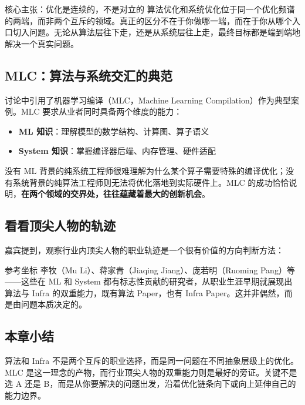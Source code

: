 \documentclass[a4paper]{article}
\begin{document}
\begin{importantbox}{核心主张：优化是连续的，不是对立的}
算法优化和系统优化位于同一个优化频谱的两端，而非两个互斥的领域。真正的区分不在于你做哪一端，而在于你从哪个入口切入问题。无论从算法层往下走，还是从系统层往上走，最终目标都是端到端地解决一个真实问题。
\end{importantbox}

\subsection{MLC：算法与系统交汇的典范}

讨论中引用了机器学习编译（MLC，Machine Learning Compilation）作为典型案例。MLC 要求从业者同时具备两个维度的能力：

\begin{itemize}
    \item \textbf{ML 知识}：理解模型的数学结构、计算图、算子语义
    \item \textbf{System 知识}：掌握编译器后端、内存管理、硬件适配
\end{itemize}

没有 ML 背景的纯系统工程师很难理解为什么某个算子需要特殊的编译优化；没有系统背景的纯算法工程师则无法将优化落地到实际硬件上。MLC 的成功恰恰说明，\textbf{在两个领域的交界处，往往蕴藏着最大的创新机会}。

\subsection{看看顶尖人物的轨迹}

嘉宾提到，观察行业内顶尖人物的职业轨迹是一个很有价值的方向判断方法：

\begin{knowledgebox}{参考坐标}
李牧（Mu Li）、蒋家青（Jiaqing Jiang）、庞若明（Ruoming Pang）等——这些在 ML 和 System 都有标志性贡献的研究者，从职业生涯早期就展现出算法与 Infra 的双重能力，既有算法 Paper，也有 Infra Paper。这并非偶然，而是由问题本质决定的。
\end{knowledgebox}

\subsection{本章小结}

算法和 Infra 不是两个互斥的职业选择，而是同一问题在不同抽象层级上的优化。MLC 是这一理念的产物，而行业顶尖人物的双重能力则是最好的旁证。关键不是选 A 还是 B，而是从你要解决的问题出发，沿着优化链条向下或向上延伸自己的能力边界。
\end{document}
